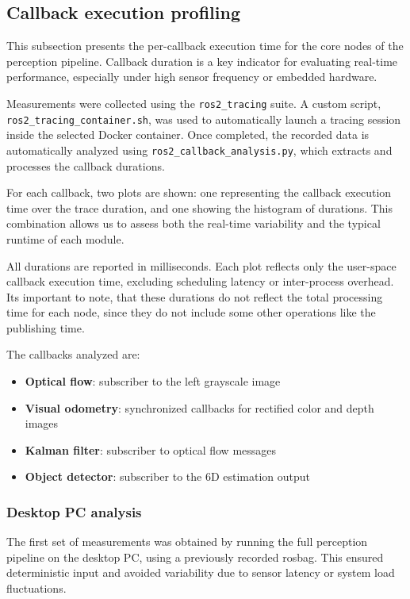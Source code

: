 \subsection{Callback execution profiling}\label{sec:CallbackAnalysis}

This subsection presents the per-callback execution time for the core 
nodes of the perception pipeline. Callback duration is a key indicator 
for evaluating real-time performance, especially under high sensor 
frequency or embedded hardware.

Measurements were collected using the \texttt{ros2\_tracing} suite. A 
custom script, \texttt{ros2\_tracing\_container.sh}, was used to 
automatically launch a tracing session inside the selected Docker 
container. Once completed, the recorded data is automatically analyzed using 
\texttt{ros2\_callback\_analysis.py}, which extracts and processes the 
callback durations.

For each callback, two plots are shown: one representing the callback 
execution time over the trace duration, and one showing the histogram 
of durations. This combination allows us to assess both the real-time 
variability and the typical runtime of each module.

All durations are reported in milliseconds. Each plot reflects only the 
user-space callback execution time, excluding scheduling latency or 
inter-process overhead. Its important to note, that these durations do not reflect the total processing time for 
each node, since they do not include some other operations like the publishing time.

The callbacks analyzed are:


\begin{itemize}
  \item \textbf{Optical flow}: subscriber to the left grayscale image
  \item \textbf{Visual odometry}: synchronized callbacks for rectified color and depth images
  \item \textbf{Kalman filter}: subscriber to optical flow messages
  \item \textbf{Object detector}: subscriber to the 6D estimation output
\end{itemize}

\subsubsection{Desktop PC analysis}

The first set of measurements was obtained by running the full 
perception pipeline on the desktop PC, using a previously recorded 
rosbag. This ensured deterministic input and avoided variability due to 
sensor latency or system load fluctuations.

